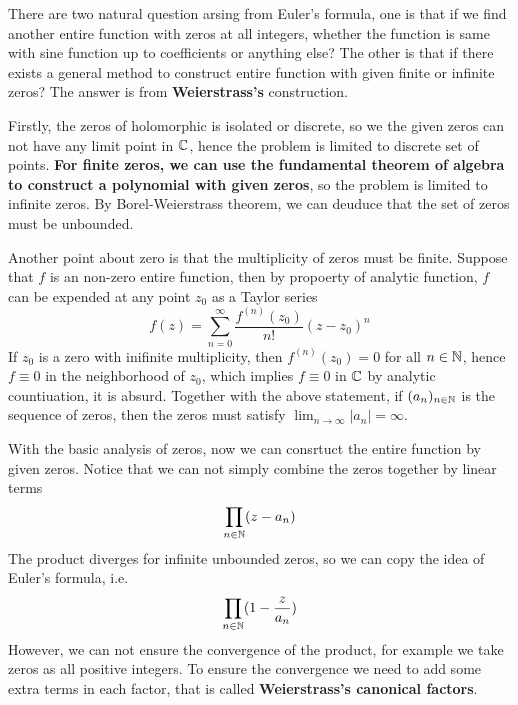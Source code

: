 There are two natural question arsing from Euler's formula, one is that if we find another entire function with zeros at all integers, whether the function is same with sine function up to coefficients or anything else? The other is that if there exists a general method to construct entire function with given finite or infinite zeros? The answer is from \textbf{Weierstrass's} construction.

Firstly, the zeros of holomorphic is isolated or discrete, so we the given zeros can not have any limit point in \(\mathbb{C}\), hence the problem is limited to discrete set of points. \textbf{For finite zeros, we can use the fundamental theorem of algebra to construct a polynomial with given zeros}, so the problem is limited to infinite zeros. By Borel-Weierstrass theorem, we can deuduce that the set of zeros must be unbounded.

Another point about zero is that the multiplicity of zeros must be finite. Suppose that \(f\) is an non-zero entire function, then by propoerty of analytic function, \(f\) can be expended at any point \(z_0\) as a Taylor series
\[f(z) = \sum_{n=0}^{\infty} \frac{f^{(n)}(z_0)}{n!} (z - z_0)^n\]
If \(z_0 \) is a zero with inifinite multiplicity, then \(f^{(n)}(z_0) = 0\) for all \(n \in \mathbb{N}\), hence \(f \equiv 0\) in the neighborhood of \(z_0\), which implies \(f \equiv 0\) in \(\mathbb{C}\) by analytic countiuation, it is absurd. Together with the above statement, if \((a_n)_{n \in \mathbb{N}}\) is the sequence of zeros, then the zeros must satisfy \(\lim_{n \to \infty} |a_n| = \infty\).

With the basic analysis of zeros, now we can consrtuct the entire function by given zeros. Notice that we can not simply combine the zeros together by linear terms
\[\prod_{n \in \mathbb{N}} (z-a_n)\]
The product diverges for infinite unbounded zeros, so we can copy the idea of Euler's formula, i.e.
\[\prod_{n \in \mathbb{N}} (1 - \frac{z}{a_n})\]
However, we can not ensure the convergence of the product, for example we take zeros as all positive integers. To ensure the convergence we need to add some extra terms in each factor, that is called \textbf{Weierstrass's canonical factors}.

